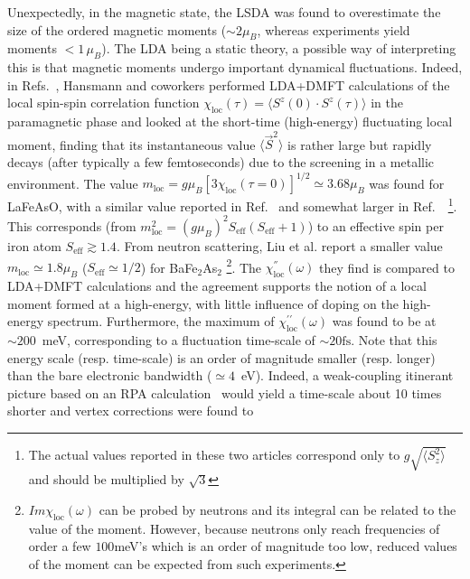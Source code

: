 \documentclass[]{ar2e-changed}%
\def\chiloc{\chi_{\mathrm{loc}}}
\def\chiloc{\chi_{\mathrm{loc}}}
\def\Seff{S_{\mathrm{eff}}}
\def\mloc{m_{\mathrm{loc}}}
\def\BFA{BaFe$_2$As$_2$}
\begin{document}
%
% 
Unexpectedly, in the magnetic state, the LSDA was found to overestimate
the size of the ordered magnetic moments ($\sim 2\mu_B$, whereas
experiments yield  moments $<1\,\mu_B$). The LDA
being a static theory, a possible way of interpreting this is that
magnetic moments undergo important dynamical fluctuations. Indeed, in Refs.~\cite{Hansmann_localmoment_prl,Toschi_moment_screening_FeSC},
Hansmann and coworkers performed LDA+DMFT calculations of the
local spin-spin correlation function $\chiloc(\tau)=\langle
S^z(0)\cdot S^z(\tau)\rangle$ in the paramagnetic phase and looked at the short-time
(high-energy) fluctuating local moment, finding that its instantaneous
value $\langle \vec{S}^2\rangle$ is rather large but rapidly decays (after
typically a few femtoseconds) due to the screening in a  metallic
environment. 
%
The value $m_{\mathrm{loc}}=g\mu_B[3\chiloc(\tau=0)]^{1/2}\simeq 3.68\mu_B$ was found for
LaFeAsO, with a similar value reported in
Ref.~\cite{Aichhorn_full_charge_SC_LaFeAsO} and somewhat larger in
Ref.~\cite{Yin_kinetic_frustration_allFeSC}~\footnote{The actual values
reported in these two articles correspond only to $g\sqrt{\langle S_z^2
\rangle}$ and should be multiplied by $\sqrt{3}$}.  This corresponds
(from $m_{\mathrm{loc}}^2=(g\mu_B)^2 \Seff(\Seff+1)$) to an effective
spin per iron atom $\Seff \gtrsim 1.4$. 
%
From neutron scattering, Liu et al. \cite{Liu_magmoments_122} report a smaller
value $\mloc \simeq 1.8 \mu_B$ ($\Seff\simeq 1/2$) for \BFA 
\footnote{$Im\chiloc(\omega)$ can be probed by neutrons and its
integral can be related to the value of the moment. However, because
neutrons only reach frequencies of order a few $100$meV's  
which is an order of magnitude too low, reduced values
of the moment can be expected from such experiments.}.
%
The $\chiloc^{''}(\omega)$ they find is compared to LDA+DMFT calculations and the
agreement supports the notion of a local moment formed at a high-energy,
with little influence of doping on the high-energy
spectrum. Furthermore, the maximum of $\chiloc^{\prime\prime}(\omega)$
was found to be at $\sim 200$~meV, corresponding to a fluctuation
time-scale of $\sim 20\mathrm{fs}$.
%
Note that this energy scale (resp. time-scale) is an order of
magnitude smaller (resp. longer) than the bare electronic bandwidth
($\simeq 4$~eV).  Indeed, a weak-coupling itinerant picture based on
an RPA calculation~\cite{Liu_magmoments_122,Toschi_moment_screening_FeSC} would yield a
time-scale about 10 times shorter and vertex corrections were found to
\end{document}

